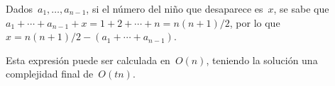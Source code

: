 
Dados~$a_1, \dots, a_{n-1}$, si el número del niño que desaparece es~$x$, se sabe
que~$a_1 + \cdots + a_{n - 1} + x = 1 + 2 + \cdots + n = n(n + 1) / 2$, por lo
que~$x = n(n + 1) / 2 - (a_1 + \cdots + a_{n - 1})$.

Esta expresión puede ser calculada en~$O(n)$, teniendo la solución una complejidad
final de~$O(tn)$.

